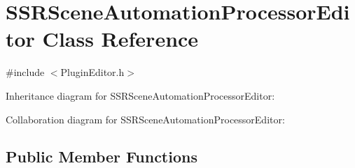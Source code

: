 \hypertarget{classSSRSceneAutomationProcessorEditor}{\section{S\-S\-R\-Scene\-Automation\-Processor\-Editor Class Reference}
\label{classSSRSceneAutomationProcessorEditor}
}


{\ttfamily \#include $<$Plugin\-Editor.\-h$>$}



Inheritance diagram for S\-S\-R\-Scene\-Automation\-Processor\-Editor\-:


Collaboration diagram for S\-S\-R\-Scene\-Automation\-Processor\-Editor\-:
\subsection*{Public Member Functions}
